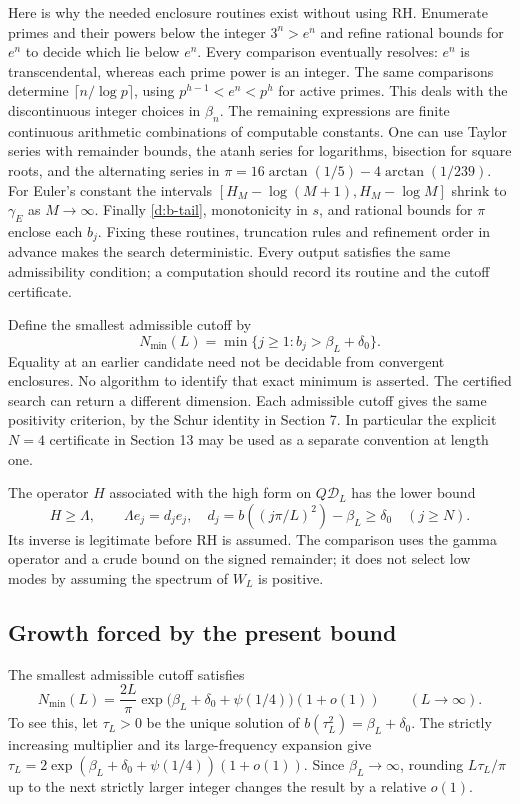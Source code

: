 Here is why the needed enclosure routines exist without using RH.
Enumerate primes and their powers below the integer $3^n>e^n$ and refine
rational bounds for $e^n$ to decide which lie below $e^n$. Every comparison
eventually resolves: $e^n$ is transcendental, whereas each prime power is
an integer. The same comparisons determine
$\lceil n/\log p\rceil$, using $p^{h-1}<e^n<p^h$ for active primes.
This deals with the discontinuous integer choices in $\beta_n$.
The remaining expressions are finite continuous arithmetic combinations
of computable constants. One can use Taylor series with remainder bounds,
the atanh series for logarithms, bisection for square roots, and the
alternating series in
$\pi=16\arctan(1/5)-4\arctan(1/239)$.
For Euler's constant the intervals
$[H_M-\log(M+1),H_M-\log M]$ shrink to $\gamma_E$ as $M\to\infty$.
Finally \eqref{d:b-tail}, monotonicity in $s$, and rational bounds for
$\pi$ enclose each $b_j$. Fixing these routines, truncation rules and
refinement order in advance makes the search deterministic.
Every output satisfies the same admissibility condition; a computation
should record its routine and the cutoff certificate.

Define the smallest admissible cutoff by
\[
N_{\min}(L)=\min\{j\ge1:b_j>\beta_L+\delta_0\}.
\]
Equality at an earlier candidate need not be decidable from convergent enclosures.
No algorithm to identify that exact minimum is asserted.
The certified search can return a different dimension. Each admissible
cutoff gives the same positivity criterion, by the Schur identity in Section 7.
In particular the explicit $N=4$ certificate in Section 13 may be used
as a separate convention at length one.

The operator $H$ associated with the high form on $Q\mathcal D_L$ has
the lower bound
\[
H\ge\Lambda,\qquad\Lambda e_j=d_je_j,\quad
d_j=b((j\pi/L)^2)-\beta_L\ge\delta_0\quad(j\ge N).
\]
Its inverse is legitimate before RH is assumed. The comparison uses the
gamma operator and a crude bound on the signed remainder; it does not
select low modes by assuming the spectrum of $W_L$ is positive.

\subsection{Growth forced by the present bound}\label{d:cutoff-growth}
The smallest admissible cutoff satisfies
\begin{equation}\label{d:cutoff-scale}
N_{\min}(L)=\frac{2L}{\pi}
\exp\bigl(\beta_L+\delta_0+\psi(1/4)\bigr)(1+o(1))
\qquad(L\to\infty).
\end{equation}
To see this, let $\tau_L>0$ be the unique solution of
$b(\tau_L^2)=\beta_L+\delta_0$. The strictly increasing multiplier and
its large-frequency expansion give
$\tau_L=2\exp(\beta_L+\delta_0+\psi(1/4))(1+o(1))$.
Since $\beta_L\to\infty$, rounding $L\tau_L/\pi$ up to the next strictly
larger integer changes the result by a relative $o(1)$.

